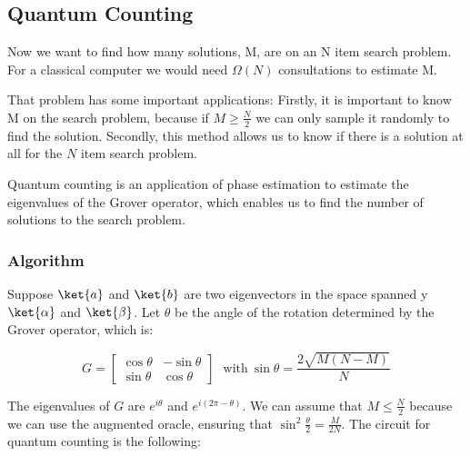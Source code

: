 \subsection{Quantum Counting}
\label{subsec: Quantum Counting}

Now we want to find how many solutions, M, are on an N item search problem. For a classical computer we would need $\Omega(N)$ consultations to estimate M.

That problem has some important applications: Firstly, it is important to know M on the search problem, because if $M \geq \frac{N}{2}$ we can only sample it randomly to find the solution. Secondly, this method allows us to know if there is a solution at all for the $N$ item search problem.

Quantum counting is an application of phase estimation to estimate the eigenvalues of the Grover operator, which enables us to find the number of solutions to the search problem.

\subsubsection{Algorithm}
\label{Subsubsec: Quantum Counting: Algorithm}

Suppose $\ket{a}$ and $\ket{b}$ are two eigenvectors in the space spanned y $\ket{\alpha}$ and $\ket{\beta}$. Let $\theta$ be the angle of the rotation determined by the Grover operator, which is:

\begin{equation*}
    G = \begin{bmatrix}
    \cos \theta & -\sin \theta \\
    \sin \theta & \cos \theta
    \end{bmatrix} \ \ \ \text{with} \ \sin \theta = \frac{2 \sqrt{M(N-M)}}{N}
\end{equation*}

The eigenvalues of $G$ are $e^{i\theta}$ and $e^{i(2 \pi - \theta)}$. We can assume that $M \leq \frac{N}{2}$ because we can use the augmented oracle, ensuring that $\sin^2 \frac{\theta}{2} = \frac{M}{2N}$. The circuit for quantum counting is the following:

